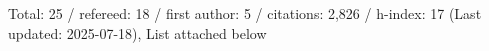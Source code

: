 Total: 25 / refereed: 18 / first author: 5 / citations: 2,826 / h-index: 17 (Last updated: 2025-07-18), List attached below